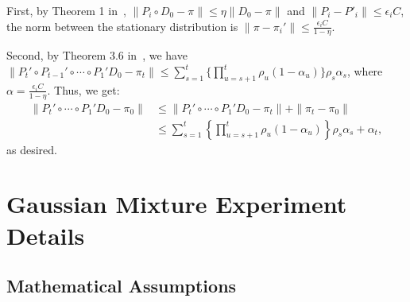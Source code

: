\documentclass{article}
\begin{document}
First, by Theorem 1 in~\cite{cutting_mh_2014}, $\|P_i \circ D_0 - \pi\| \leq \eta \|D_0
- \pi\|$ and $\|P_i-P'_i\| \leq \epsilon_i C$, the norm between the stationary distribution is $\|\pi
- \pi_i'\|\leq \frac{\epsilon_i C}{1-\eta}$.

Second, by Theorem 3.6 in~\cite{yang2013sequential}, we have  $\| P_t' \circ P_{t-1}' \circ \cdots
\circ P_1' D_0 - \pi_t \| \leq \sum_{s=1}^t \{\prod _{u=s+1}^t \rho_u (1-\alpha_u)\} \rho_s
\alpha_s$, where $\alpha = \frac{\epsilon_i C}{1-\eta}$. Thus, we get:
\begin{align*}
 \| P_t' \circ \cdots \circ P_1' D_0 - \pi_0 \| &\leq \|P_t' \circ \cdots \circ P_1' D_0 - \pi_t\| + \|\pi_t - \pi_0\| \\
 &\leq \sum_{s=1}^t \left\{\prod _{u=s+1}^t \rho_u (1-\alpha_u)\right\} \rho_s \alpha_s + \alpha_t,
\end{align*}
as desired.




\section{Gaussian Mixture Experiment Details}\label{app:gaussian}

\subsection{Mathematical Assumptions}
\end{document}
